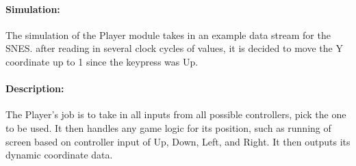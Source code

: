 \documentclass[]{article}
\begin{document}
\paragraph{Simulation:} The simulation of the Player module takes in an example data stream for the SNES. after reading in several clock cycles of values, it is decided to move the Y coordinate up to 1 since the keypress was Up.
\paragraph{Description:} The Player's job is to take in all inputs from all possible controllers, pick the one to be used. It then handles any game logic for its position, such as running of screen based on controller input of Up, Down, Left, and Right. It then outputs its dynamic coordinate data.
\end{document}
